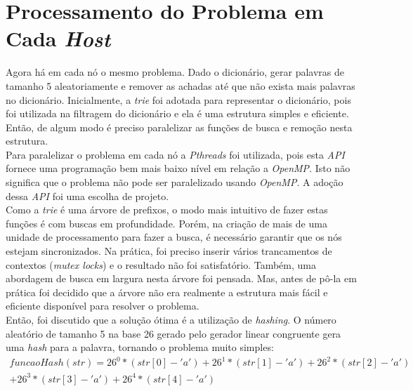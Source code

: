 \documentclass[a4paper]{article}
\begin{document}
\section{Processamento do Problema em Cada \emph{Host}}
\indent \indent Agora há em cada nó o mesmo problema. Dado o dicionário, gerar palavras de tamanho 5 aleatoriamente e remover as achadas até que não exista mais palavras no dicionário. Inicialmente, a \emph{trie} foi adotada para representar o dicionário, pois foi utilizada na filtragem do dicionário e ela é uma estrutura simples e eficiente. Então, de algum modo é preciso paralelizar as funções de busca e remoção nesta estrutura.\\
\indent Para paralelizar o problema em cada nó a \emph{Pthreads} foi utilizada, pois esta \emph{API} fornece uma programação bem mais baixo nível em relação a \emph{OpenMP}. Isto não significa que o problema não pode ser paralelizado usando \emph{OpenMP}. A adoção dessa \emph{API} foi uma escolha de projeto.\\
\indent Como a \emph{trie} é uma árvore de prefixos, o modo mais intuitivo de fazer estas funções é com buscas em profundidade. Porém, na criação de mais de uma unidade de processamento para fazer a busca, é necessário garantir que os nós estejam sincronizados. Na prática, foi preciso inserir vários trancamentos de contextos (\emph{mutex locks}) e o resultado não foi satisfatório. Também, uma abordagem de busca em largura nesta árvore foi pensada. Mas, antes de pô-la em prática foi decidido que a árvore não era realmente a estrutura mais fácil e eficiente disponível para resolver o problema.\\
\indent Então, foi discutido que a solução ótima é a utilização de \emph{hashing}. O número aleatório de tamanho 5 na base 26 gerado pelo gerador linear congruente gera uma \emph{hash} para a palavra, tornando o problema muito simples:
\begin{eqnarray*}
	funcaoHash(str) = 26^0*(str[0] - 'a') + 26^1*(str[1] - 'a') + 26^2*(str[2] - 'a')\\
	+ 26^3*(str[3] - 'a') + 26^4*(str[4] - 'a')
\end{eqnarray*}
\end{document}
